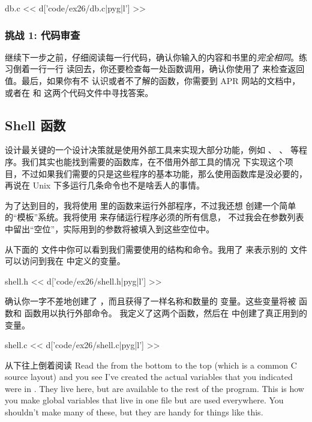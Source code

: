 \begin{code}{db.c}
<< d['code/ex26/db.c|pyg|l'] >>
\end{code}

\subsubsection{挑战 1: 代码审查}

继续下一步之前，仔细阅读每一行代码，确认你输入的内容和书里的\emph{完全相同}。练习倒着一行一行
读回去，你还要检查每一处函数调用，确认你使用了  来检查返回值。最后，如果你有不
认识或者不了解的函数，你需要到 APR 网站的文档中，或者在  和   
这两个代码文件中寻找答案。


\subsection{Shell 函数}

 设计最关键的一个设计决策就是使用外部工具来实现大部分功能，例如 、
、 等程序。我们其实也能找到需要的函数库，在不借用外部工具的情况
下实现这个项目，不过如果我们需要的只是这些程序的基本功能，那么使用函数库是没必要的，再说在 
Unix 下多运行几条命令也不是啥丢人的事情。

为了达到目的，我将使用  里的函数来运行外部程序，不过我还想
创建一个简单的“模板”系统。我将使用  来存储运行程序必须的所有信息，
不过我会在参数列表中留出“空位”，实际用到的参数将被填入到这些空位中。

从下面的  文件中你可以看到我们需要使用的结构和命令。我用了  
来表示别的  文件可以访问到我在  中定义的变量。

\begin{code}{shell.h}
<< d['code/ex26/shell.h|pyg|l'] >>
\end{code}

确认你一字不差地创建了 ，而且获得了一样名称和数量的  
变量。这些变量将被  函数和  函数用以执行外部命令。
我定义了这两个函数，然后在  中创建了真正用到的变量。

\begin{code}{shell.c}
<< d['code/ex26/shell.c|pyg|l'] >>
\end{code}

从下往上倒着阅读  
Read the  from the bottom to the top (which is a common C source
layout) and you see I've created the actual  variables that you
indicated were  in .  They live here, but are 
available to the rest of the program.  This is how you make global variables
that live in one  file but are used everywhere.  You shouldn't make
many of these, but they are handy for things like this.

